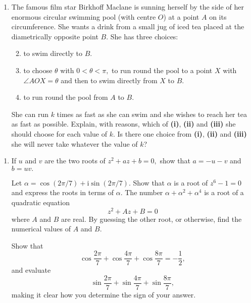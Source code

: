 \documentclass[a4, 11pt]{report}
\newlength{\qspace}
\newcounter{qnumber}
\newenvironment{question}%
 {\vspace{\qspace}
  \begin{enumerate}[\bfseries 1\quad][10]%
    \setcounter{enumi}{\value{qnumber}}%
    \item%
 }
{
  \end{enumerate}
  \filbreak
  \stepcounter{qnumber}
 }
\newenvironment{questionparts}[1][1]%
 {
  \begin{enumerate}[\bfseries (i)]%
    \setcounter{enumii}{#1}
    \addtocounter{enumii}{-1}
    \setlength{\itemsep}{5mm}
    \setlength{\parskip}{8pt}
 }
 {
  \end{enumerate}
 }
\begin{document}
\begin{question}
The famous film star Birkhoff Maclane is sunning herself by the side
of her enormous circular swimming pool (with centre $O$) at a point
$A$ on its circumference. She wants a drink from a small jug of iced
tea placed at the diametrically opposite point $B$. She has three
choices: 

\begin{questionparts}
\item to swim directly to $B$. 
\item to choose $\theta$ with $0<\theta<\pi,$ to run round the pool to
a point $X$ with $\angle AOX=\theta$ and then to swim directly from
$X$ to $B$. 
\item to run round the pool from $A$ to $B$. 
\end{questionparts}

She can run $k$ times as fast as she can swim and she wishes to reach
her tea as fast as possible. Explain, with reasons, which of \textbf{(i)},
\textbf{(ii) }and \textbf{(iii) }she should choose for each value
of $k$. Is there one choice from \textbf{(i)}, \textbf{(ii) }and
\textbf{(iii) }she will never take whatever the value of $k$?
	\end{question}
	
\begin{question}
If $u$ and $v$ are the two roots of $z^{2}+az+b=0,$ show that $a=-u-v$
and $b=uv.$


Let $\alpha=\cos(2\pi/7)+\mathrm{i}\sin(2\pi/7).$ Show
that $\alpha$ is a root of $z^{6}-1=0$ and express the roots in
terms of $\alpha.$ The number $\alpha+\alpha^{2}+\alpha^{4}$ is
a root of a quadratic equation 
\[
z^{2}+Az+B=0
\]
where $A$ and $B$ are real. By guessing the other root, or otherwise,
find the numerical values of $A$ and $B$. 


Show that 
\[
\cos\frac{2\pi}{7}+\cos\frac{4\pi}{7}+\cos\frac{8\pi}{7}=-\frac{1}{2},
\]
and evaluate 
\[
\sin\frac{2\pi}{7}+\sin\frac{4\pi}{7}+\sin\frac{8\pi}{7},
\]
making it clear how you determine the sign of your answer.
\end{question}
	
\end{document}
